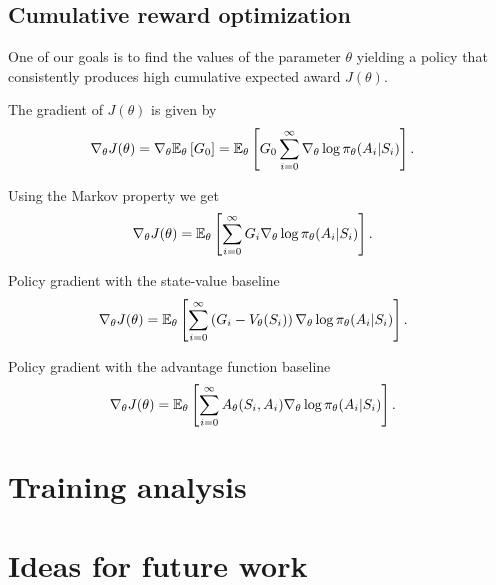 \documentclass[a4paper,12pt]{amsart}
\newcommand{\stateValueFunc}{V}
\newcommand{\advantageFunc}{A}
\newcommand{\policy}{\pi}
\begin{document}
\subsection{Cumulative reward optimization}
One of our goals is to find the values of the parameter $\theta$ yielding a
policy that consistently produces high cumulative expected award $J(\theta)$.

The gradient of $J(\theta)$ is given by
\begin{align*}
    \nabla_{\theta} J(\theta) &= 
    \nabla_{\theta} \E_{\theta} \left[ G_{0} \right] = 
    \E_{\theta} \left[ G_0 \sum_{i=0}^{\infty} 
    \nabla_{\theta}\log\policy_{\theta}(A_i | S_i) \right].
\end{align*}

Using the Markov property we get
\begin{align*}
    \nabla_{\theta} J(\theta) &= 
    \E_{\theta} \left[ \sum_{i=0}^{\infty} G_{i}
    \nabla_{\theta}\log\policy_{\theta}(A_i | S_i)  \right].
\end{align*}

Policy gradient with the state-value baseline
\begin{align*}
    \nabla_{\theta} J(\theta) &= 
    \E_{\theta} \left[ \sum_{i=0}^{\infty} \left( G_{i}-\stateValueFunc_{\theta}(S_i) \right)
    \nabla_{\theta}\log\policy_{\theta}(A_i | S_i) \right].
\end{align*}

Policy gradient with the advantage function baseline
\begin{align*}
    \nabla_{\theta} J(\theta) &= 
    \E_{\theta} \left[ \sum_{i=0}^{\infty} \advantageFunc_{\theta}(S_i, A_i)
    \nabla_{\theta}\log\policy_{\theta}(A_i | S_i) \right].
\end{align*}


\section{Training analysis}

\section{Ideas for future work}

\nocite{Cinlar2011}
\printbibliography
\end{document}
